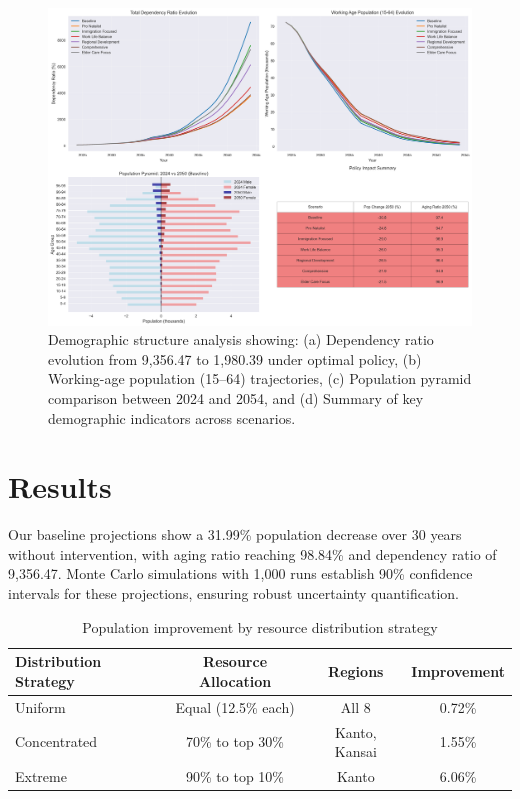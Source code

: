 \documentclass{article} %
\begin{document}
\begin{figure}[t]
    \centering
    \includegraphics[width=\textwidth]{demographic_transition.png}
    \caption{Demographic structure analysis showing: (a) Dependency ratio evolution from 9,356.47 to 1,980.39 under optimal policy, (b) Working-age population (15--64) trajectories, (c) Population pyramid comparison between 2024 and 2054, and (d) Summary of key demographic indicators across scenarios.}
    \label{fig:demographic_transition}
\end{figure}

\section{Results}
\label{sec:results}

Our baseline projections show a 31.99\% population decrease over 30 years without intervention, with aging ratio reaching 98.84\% and dependency ratio of 9,356.47. Monte Carlo simulations with 1,000 runs establish 90\% confidence intervals for these projections, ensuring robust uncertainty quantification.

\begin{table}[t]
\centering
\caption{Population improvement by resource distribution strategy}
\begin{tabular}{lccc}
\toprule
Distribution Strategy & Resource Allocation & Regions & Improvement \\
\midrule
Uniform & Equal (12.5\% each) & All 8 & 0.72\% \\
Concentrated & 70\% to top 30\% & Kanto, Kansai & 1.55\% \\
Extreme & 90\% to top 10\% & Kanto & 6.06\% \\
\bottomrule
\end{tabular}
\label{tab:distribution_comparison}
\end{table}
\end{document}
